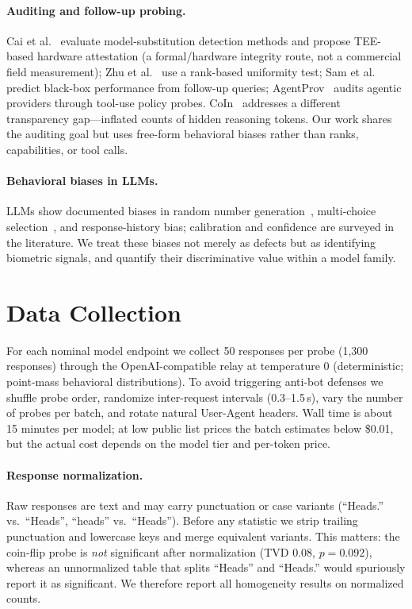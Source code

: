 \documentclass[11pt]{article}
\begin{document}
\paragraph{Auditing and follow-up probing.}
Cai et al.~\cite{cai2025pay} evaluate model-substitution detection methods and propose TEE-based hardware attestation (a formal/hardware integrity route, not a commercial field measurement); Zhu et al.~\cite{zhu2025rank} use a rank-based uniformity test; Sam et al.~\cite{sam2025followup} predict black-box performance from follow-up queries; AgentProv~\cite{wang2026agentprov} audits agentic providers through tool-use policy probes. CoIn~\cite{sun2025coin} addresses a different transparency gap---inflated counts of hidden reasoning tokens. Our work shares the auditing goal but uses free-form behavioral biases rather than ranks, capabilities, or tool calls.

\paragraph{Behavioral biases in LLMs.}
LLMs show documented biases in random number generation~\cite{coronado2025rng}, multi-choice selection~\cite{zheng2023selection}, and response-history bias; calibration and confidence are surveyed in the literature. We treat these biases not merely as defects but as identifying biometric signals, and quantify their discriminative value within a model family.

\section{Data Collection}
\label{sec:collect}

For each nominal model endpoint we collect 50 responses per probe (1{,}300 responses) through the OpenAI-compatible relay at temperature 0 (deterministic; point-mass behavioral distributions). To avoid triggering anti-bot defenses we shuffle probe order, randomize inter-request intervals (0.3--1.5\,s), vary the number of probes per batch, and rotate natural User-Agent headers. Wall time is about 15 minutes per model; at low public list prices the batch estimates below \$0.01, but the actual cost depends on the model tier and per-token price.

\paragraph{Response normalization.} Raw responses are text and may carry punctuation or case variants (``Heads.'' vs.\ ``Heads'', ``heads'' vs.\ ``Heads''). Before any statistic we strip trailing punctuation and lowercase keys and merge equivalent variants. This matters: the coin-flip probe is \emph{not} significant after normalization (TVD 0.08, $p=0.092$), whereas an unnormalized table that splits ``Heads'' and ``Heads.'' would spuriously report it as significant. We therefore report all homogeneity results on normalized counts.
\end{document}
